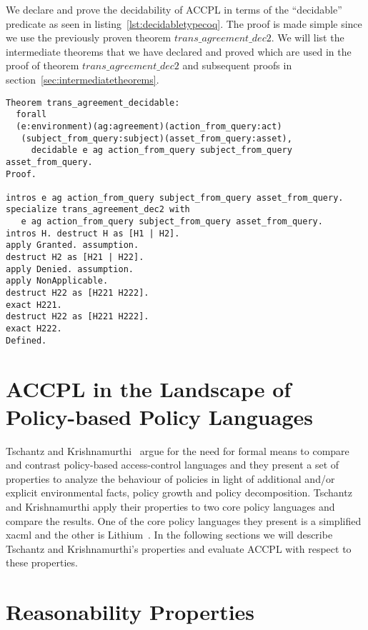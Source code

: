 We declare and prove the decidability of \ac{ACCPL} in terms of the ``decidable'' predicate as seen in listing~\ref{lst:decidabletypecoq}. The proof is made simple since we use the previously proven theorem $trans\_agreement\_dec2$. We will list the intermediate theorems that we have declared and proved which are used in the proof of theorem $trans\_agreement\_dec2$ and subsequent proofs in section~\ref{sec:intermediatetheorems}.

\begin{lstlisting}
Theorem trans_agreement_decidable:
  forall
  (e:environment)(ag:agreement)(action_from_query:act)
   (subject_from_query:subject)(asset_from_query:asset),
     decidable e ag action_from_query subject_from_query asset_from_query.
Proof.

intros e ag action_from_query subject_from_query asset_from_query.
specialize trans_agreement_dec2 with 
   e ag action_from_query subject_from_query asset_from_query.
intros H. destruct H as [H1 | H2].
apply Granted. assumption.
destruct H2 as [H21 | H22].
apply Denied. assumption.
apply NonApplicable. 
destruct H22 as [H221 H222].
exact H221.
destruct H22 as [H221 H222].
exact H222.
Defined.

\end{lstlisting}

 
\section{ACCPL in the Landscape of Policy-based Policy Languages}

Tschantz and Krishnamurthi~\cite{Tschantz} argue for the need for formal means to compare and contrast policy-based access-control languages and they present a set of properties to analyze the behaviour of policies in light of additional and/or explicit environmental facts, policy growth and policy decomposition. Tschantz and Krishnamurthi apply their properties to two core policy languages and compare the results. One of the core policy languages they present is a simplified \ac{xacml} and the other is Lithium~\cite{Halpern2008}. In the following sections we will describe Tschantz and Krishnamurthi's properties and evaluate \ac{ACCPL} with respect to these properties.

\section{Reasonability Properties}

